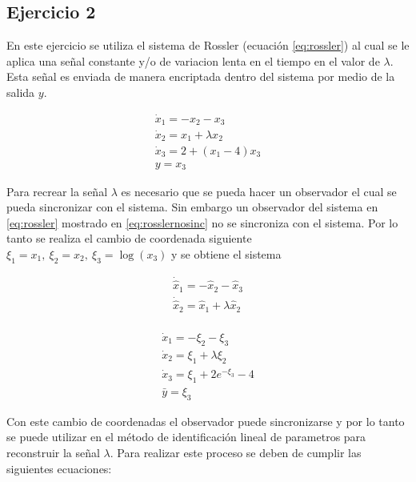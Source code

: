 \subsection*{Ejercicio 2}

En este ejercicio se utiliza el sistema de Rossler (ecuación \ref{eq:rossler}) al cual se le aplica una señal constante y/o de variacion lenta en el tiempo en el valor de $\lambda$. Esta señal es enviada de manera encriptada dentro del sistema por medio de la salida $y$.

\begin{equation}\label{eq:rossler}
	\begin{array}{c}
		\dot{x}_1 = -x_2 - x_3\\
		\dot{x}_2 = x_1 + \lambda x_2\\
		\dot{x}_3 = 2 + (x_1 - 4)x_3\\
		y = x_3
	\end{array}
\end{equation}

Para recrear la señal $\lambda$ es necesario que se pueda hacer un observador el cual se pueda sincronizar con el sistema. Sin embargo un observador del sistema en \ref{eq:rossler} mostrado en \ref{eq:rosslernosinc} no se sincroniza con el sistema. Por lo tanto se realiza el cambio de coordenada siguiente $\xi_1 = x_1, \ \xi_2 = x_2, \ \xi_3 = \log(x_3) $ y se obtiene el sistema 

\begin{equation}\label{eq:rosslernosinc}
	\begin{array}{c}
		\dot{\hat{x}}_1 = -\hat{x}_2 - \hat{x}_3\\
		\dot{\hat{x}}_2 = \hat{x}_1 + \lambda \hat{x}_2\\
	\end{array}
\end{equation}

\begin{equation}
	\begin{array}{c}
		\dot{x}_1 = -\xi_2 - \xi_3\\
		\dot{x}_2 = \xi_1 + \lambda \xi_2\\
		\dot{x}_3 = \xi_1 + 2e^{-\xi_3} - 4\\
		\bar{y} = \xi_3
	\end{array}
\end{equation}

Con este cambio de coordenadas el observador puede sincronizarse y por lo tanto se puede utilizar en el método de identificación lineal de parametros para reconstruir la señal $\lambda$. Para realizar este proceso se deben de cumplir las siguientes ecuaciones:

